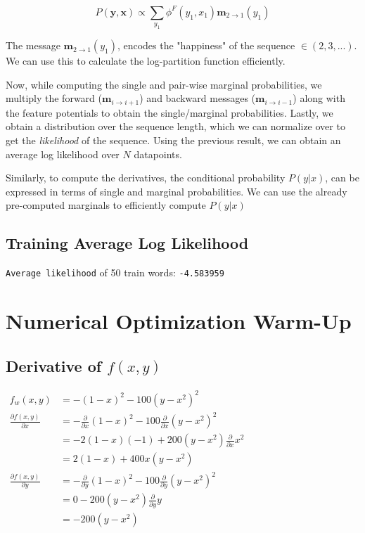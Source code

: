 \documentclass[11pt]{article}
\newcommand{\derivative}[2]{\frac{\partial #1}{\partial #2}}
\newcommand{\suml}[2]{\sum\limits_{#1}^{#2}}
\begin{document}
\begin{equation}
    P(\mathbf{y}, \mathbf{x}) \propto \suml{y_1}{} \phi^F (y_1, x_1) \mathbf{m}_{2 \rightarrow 1}(y_1)
\end{equation}

The message $\mathbf{m}_{2 \rightarrow 1} (y_1)$, encodes the "happiness" of the sequence $\in (2, 3, ...)$.
We can use this to calculate the log-partition function efficiently.

Now, while computing the single and pair-wise marginal probabilities, we multiply the forward ($\mathbf{m}_{i \rightarrow i+1}$) and backward messages ($\mathbf{m}_{i \rightarrow i-1}$) along with the feature potentials to obtain the single/marginal probabilities. Lastly, we obtain a distribution over the sequence length, which we can normalize over to get the \textit{likelihood} of the sequence. Using the previous result, we can obtain an average log likelihood over $N$ datapoints.

Similarly, to compute the derivatives, the conditional probability $P(y | x)$, can be expressed in terms of single and marginal probabilities. We can use the already pre-computed marginals to efficiently compute $P(y|x)$ 

\subsection{Training Average Log Likelihood}

\texttt{Average likelihood} of 50 train words: \texttt{-4.583959}

\clearpage
\section{Numerical Optimization Warm-Up}

\subsection{Derivative of $f(x, y)$}

\begin{math}
    \begin{aligned}
        f_w(x, y)              & = -(1-x)^2 - 100(y - x^2)^2                                       \\
        \derivative{f(x,y)}{x} & = - \derivative{}{x} (1 - x)^2 - 100 \derivative{}{x} (y - x^2)^2 \\
                               & = -2(1 - x)(-1) + 200 (y - x^2) \derivative{}{x} x^2              \\
                               & = 2(1-x) + 400x(y-x^2)                                            \\
        \derivative{f(x,y)}{y} & = - \derivative{}{y} (1 - x)^2 - 100 \derivative{}{y} (y - x^2)^2 \\
                               & = 0 - 200 (y - x^2) \derivative{}{y} y                            \\
                               & = -200(y - x^2)
    \end{aligned}
\end{math}
\end{document}
